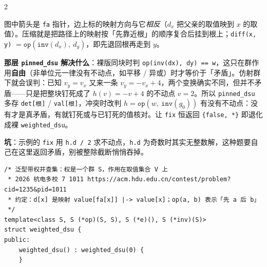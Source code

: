 \begin{multicols*}{2}
		\begin{center}
		\end{center}

		图中箭头是 \texttt{fa} 指针，边上标的映射方向与它\emph{相反}（$d_x$ 把父亲的取值映到 $x$ 的取值）。压缩就是把路径上的映射按「先靠近根」的顺序复合后挂到根上；\texttt{diff(x, y)} $= \texttt{op}(\texttt{inv}(d_x),\ d_y)$，即先退回根再走到 $y$。

		\textbf{那层 \texttt{pinned\_dsu} 解决什么}：裸版同块时判 \texttt{op(inv(dx), dy) == w}，这只在群作用\textbf{自由}（非单位元一律没有不动点，如平移 / 异或）时才等价于「矛盾」。仿射群下就会误判：已知 $v_y = v_x$ 又来一条 $v_y = -v_x + 4$，两个变换确实不同，但并不矛盾——只是把整块钉死成了 $h(v) = -v + 4$ 的不动点 $v = 2$。所以 \texttt{pinned\_dsu} 多存 \texttt{det[根]} / \texttt{val[根]}，冲突时改判 $h = \texttt{op}(w,\ \texttt{inv}(g_0))$ 有没有不动点：没有才是真矛盾，有就钉死或与已钉死的值核对。让 \texttt{fix} 恒返回 \texttt{\{false, *\}} 即退化成裸 \texttt{weighted\_dsu}。

		\textbf{坑}：示例的 \texttt{fix} 用 \texttt{h.d / 2} 求不动点，\texttt{h.d} 为奇数时其实无整数解，这种题要自己在这里返回矛盾，别被整除截断悄悄吞掉。

		\begin{verbatim}
/* 泛型带权并查集：权是一个群 S，作用在取值集合 V 上
 * 2026 杭电多校 7 1011 https://acm.hdu.edu.cn/contest/problem?cid=1235&pid=1011
 * 约定：d[x] 是映射 value[fa[x]] |-> value[x]；op(a, b) 表示「先 a 后 b」
 */
template<class S, S (*op)(S, S), S (*e)(), S (*inv)(S)>
struct weighted_dsu {
public:
	weighted_dsu() : weighted_dsu(0) {
	}


\end{verbatim}
\end{multicols*}
